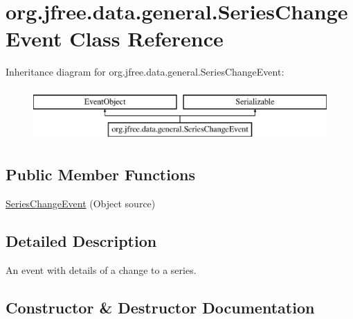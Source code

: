 \hypertarget{classorg_1_1jfree_1_1data_1_1general_1_1_series_change_event}{}\section{org.\+jfree.\+data.\+general.\+Series\+Change\+Event Class Reference}
\label{classorg_1_1jfree_1_1data_1_1general_1_1_series_change_event}
Inheritance diagram for org.\+jfree.\+data.\+general.\+Series\+Change\+Event\+:\begin{figure}[H]
\begin{center}
\leavevmode
\includegraphics[height=2.000000cm]{classorg_1_1jfree_1_1data_1_1general_1_1_series_change_event}
\end{center}
\end{figure}
\subsection*{Public Member Functions}
\begin{DoxyCompactItemize}
\item 
\mbox{\hyperlink{classorg_1_1jfree_1_1data_1_1general_1_1_series_change_event_ae2715ed82b3402aed4cc74ad8e4f72b3}{Series\+Change\+Event}} (Object source)
\end{DoxyCompactItemize}


\subsection{Detailed Description}
An event with details of a change to a series. 

\subsection{Constructor \& Destructor Documentation}
\mbox{\label{classorg_1_1jfree_1_1data_1_1general_1_1_series_change_event_ae2715ed82b3402aed4cc74ad8e4f72b3}} 
